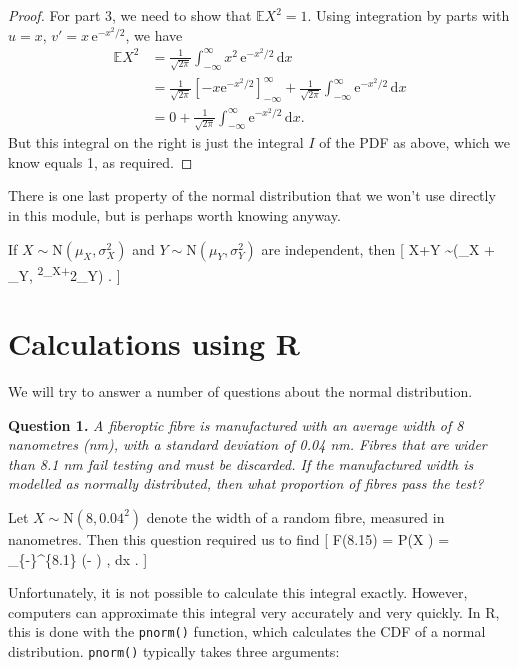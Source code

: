 \documentclass[
  letterpaper,
  DIV=11,
  numbers=noendperiod]{scrreprt}
\theoremstyle{remark}
\begin{document}
\begin{proof}
For part 3, we need to show that \(\mathbb EX^2 = 1\). Using integration
by parts with \(u = x\), \(v' = x\,\mathrm e^{-x^2/2}\), we have
\begin{align*}
\mathbb EX^2 &= \frac{1}{\sqrt{2\pi}} \int_{-\infty}^{\infty} x^2\,  \mathrm e^{-x^2/2}\, \mathrm dx \\
  &= \frac{1}{\sqrt{2\pi}} \left[-x \mathrm e^{-x^2/2}\right]_{-\infty}^\infty + \frac{1}{\sqrt{2\pi}} \int_{-\infty}^\infty \mathrm e^{-x^2/2} \, \mathrm dx \\
  &= 0 + \frac{1}{\sqrt{2\pi}} \int_{-\infty}^\infty \mathrm e^{-x^2/2} \, \mathrm dx .
\end{align*} But this integral on the right is just the integral \(I\)
of the PDF as above, which we know equals 1, as required.

\end{proof}

There is one last property of the normal distribution that we won't use
directly in this module, but is perhaps worth knowing anyway.

If \(X \sim \mathrm{N}(\mu_X, \sigma^2_X)\) and
\(Y\sim \mathrm{N}(\mu_Y, \sigma^2_Y)\) are independent, then {[} X+Y
\sim {}(\mu\_X + \mu\_Y,
\sigma\textsuperscript{2\_X+\sigma}2\_Y) . {]}

\hypertarget{normal-r}{%
\section{Calculations using R}\label{normal-r}}

We will try to answer a number of questions about the normal
distribution.

\textbf{Question 1.} \emph{A fiberoptic fibre is manufactured with an
average width of 8 nanometres (nm), with a standard deviation of 0.04
nm. Fibres that are wider than 8.1 nm fail testing and must be
discarded. If the manufactured width is modelled as normally
distributed, then what proportion of fibres pass the test?}

Let \(X \sim \mathrm{N}(8, 0.04^2)\) denote the width of a random fibre,
measured in nanometres. Then this question required us to find {[}
F(8.15) = \mathbb P(X ) = 
\int\_\{-\infty\}\^{}\{8.1\}
\exp \left(- \right) , \mathrm dx . {]}

Unfortunately, it is not possible to calculate this integral exactly.
However, computers can approximate this integral very accurately and
very quickly. In R, this is done with the \texttt{pnorm()} function,
which calculates the CDF of a normal distribution. \texttt{pnorm()}
typically takes three arguments:
\end{document}
